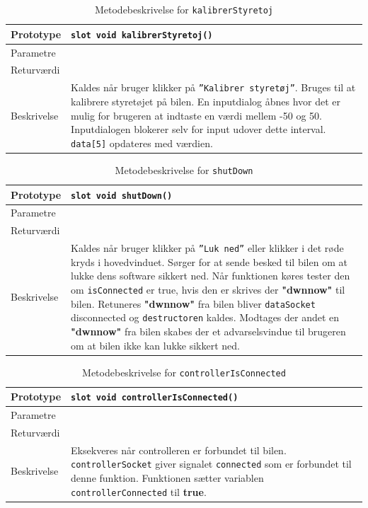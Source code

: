 \begin{table}[H]
\begin{tabularx}{\textwidth}{| l | Z |} \hline
Prototype & \texttt{slot void kalibrerStyretoj()} \\\hline
Parametre &   \\\hline
Returværdi &  \\\hline
Beskrivelse & Kaldes når bruger klikker på \texttt{''Kalibrer styretøj''}. Bruges til at kalibrere styretøjet på bilen. En inputdialog åbnes hvor det er mulig for brugeren at indtaste en værdi mellem -50 og 50. Inputdialogen blokerer selv for input udover dette interval. \texttt{data[5]} opdateres med værdien. \\\hline
\end{tabularx}
\caption{Metodebeskrivelse for \texttt{kalibrerStyretoj}}
\label{table:met_kalibrerStyretoj}
\end{table}

\begin{table}[H]
\begin{tabularx}{\textwidth}{| l | Z |} \hline
Prototype & \texttt{slot void shutDown()} \\\hline
Parametre &   \\\hline
Returværdi &  \\\hline
Beskrivelse & Kaldes når bruger klikker på \texttt{''Luk ned''} eller klikker i det røde kryds i hovedvinduet. Sørger for at sende besked til bilen om at lukke dens software sikkert ned. Når funktionen køres tester den om \texttt{isConnected} er true, hvis den er skrives der \textbf{"dwnnow"} til bilen. Retuneres \textbf{"dwnnow"} fra bilen bliver \texttt{dataSocket} disconnected og \texttt{destructoren} kaldes. Modtages der andet en \textbf{"dwnnow"} fra bilen skabes der et advarselsvindue til brugeren om at bilen ikke kan lukke sikkert ned. \\\hline
\end{tabularx}
\caption{Metodebeskrivelse for \texttt{shutDown}}
\label{table:met_shutDown}
\end{table}

\begin{table}[H]
\begin{tabularx}{\textwidth}{| l | Z |} \hline
Prototype & \texttt{slot void controllerIsConnected()} \\\hline
Parametre &   \\\hline
Returværdi &  \\\hline
Beskrivelse & Eksekveres når controlleren er forbundet til bilen. \texttt{controllerSocket} giver signalet \texttt{connected} som er forbundet til denne funktion. Funktionen sætter variablen \texttt{controllerConnected} til \textbf{true}.   \\\hline
\end{tabularx}
\caption{Metodebeskrivelse for \texttt{controllerIsConnected}}
\label{table:met_controllerIsConnected}
\end{table}

